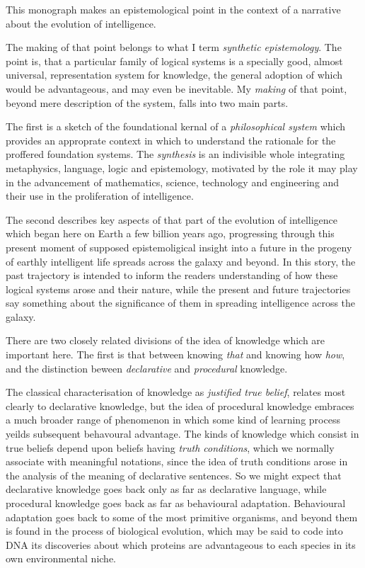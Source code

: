 
This monograph makes an epistemological point in the context of a narrative about the evolution of intelligence.

The making of that point belongs to what I term \emph{synthetic epistemology}.
The point is, that a particular family of logical systems is a specially good, almost universal, representation system for knowledge, the general adoption of which would be advantageous, and may even be inevitable.
My \emph{making} of that point, beyond mere description of the system, falls into two main parts.

The first is a sketch of the foundational kernal of a \emph{philosophical system} which provides an approprate context in which to understand the rationale for the proffered foundation systems.
The \emph{synthesis} is an indivisible whole integrating metaphysics, language, logic and epistemology, motivated by the role it may play in the advancement of mathematics, science, technology and engineering and their use in the proliferation of intelligence. 

The second describes key aspects of that part of the evolution of intelligence which began here on Earth a few billion years ago, progressing through this present moment of supposed epistemoligical insight into a future in the progeny of earthly intelligent life spreads across the galaxy and beyond.
In this story, the past trajectory is intended to inform the readers understanding of how these logical systems arose and their nature, while the present and future trajectories say something about the significance of them in spreading intelligence across the galaxy.

There are two closely related divisions of the idea of knowledge which are important here.
The first is that between knowing \emph{that} and knowing how \emph{how}, and the distinction beween \emph{declarative} and \emph{procedural} knowledge.

The classical characterisation of knowledge as \emph{justified true belief}, relates most clearly to declarative knowledge, but the idea of procedural knowledge embraces a much broader range of phenomenon in which some kind of learning process yeilds subsequent behavoural advantage.
The kinds of knowledge which consist in true beliefs depend upon beliefs having \emph{truth conditions}, which we normally associate with meaningful notations, since the idea of truth conditions arose in the analysis of the meaning of declarative sentences.
So we might expect that declarative knowledge goes back only as far as declarative language, while procedural knowledge goes back as far as behavioural adaptation.
Behavioural adaptation goes back to some of the most primitive organisms, and beyond them is found in the process of biological evolution, which may be said to code into DNA its discoveries about which proteins are advantageous to each species in its own environmental niche.





